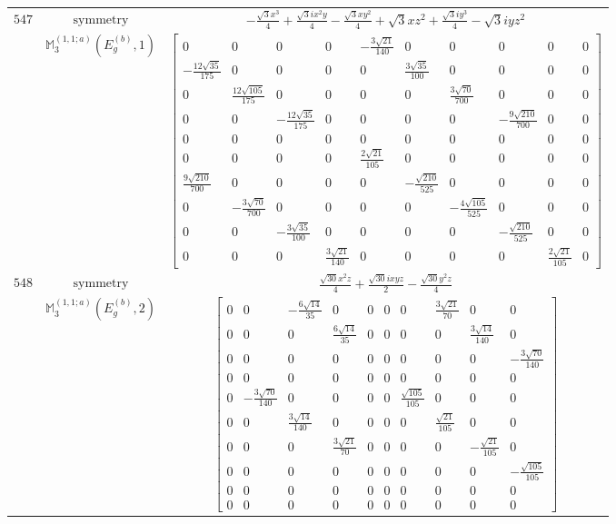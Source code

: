 \documentclass[fleqn,8pt,landscape]{jsarticle}
\begin{document}
\begin{longtable}{ccc}
$ 547 $ & $ \text{symmetry} $ & $ - \frac{\sqrt{3} x^{3}}{4} + \frac{\sqrt{3} i x^{2} y}{4} - \frac{\sqrt{3} x y^{2}}{4} + \sqrt{3} x z^{2} + \frac{\sqrt{3} i y^{3}}{4} - \sqrt{3} i y z^{2} $ \\
$  $ & $ \mathbb{M}_{3}^{(1,1;a)}(E_{g}^{(b)},1) $ & $ \begin{bmatrix} 0 & 0 & 0 & 0 & - \frac{3 \sqrt{21}}{140} & 0 & 0 & 0 & 0 & 0 \\ - \frac{12 \sqrt{35}}{175} & 0 & 0 & 0 & 0 & \frac{3 \sqrt{35}}{100} & 0 & 0 & 0 & 0 \\ 0 & \frac{12 \sqrt{105}}{175} & 0 & 0 & 0 & 0 & \frac{3 \sqrt{70}}{700} & 0 & 0 & 0 \\ 0 & 0 & - \frac{12 \sqrt{35}}{175} & 0 & 0 & 0 & 0 & - \frac{9 \sqrt{210}}{700} & 0 & 0 \\ 0 & 0 & 0 & 0 & 0 & 0 & 0 & 0 & 0 & 0 \\ 0 & 0 & 0 & 0 & \frac{2 \sqrt{21}}{105} & 0 & 0 & 0 & 0 & 0 \\ \frac{9 \sqrt{210}}{700} & 0 & 0 & 0 & 0 & - \frac{\sqrt{210}}{525} & 0 & 0 & 0 & 0 \\ 0 & - \frac{3 \sqrt{70}}{700} & 0 & 0 & 0 & 0 & - \frac{4 \sqrt{105}}{525} & 0 & 0 & 0 \\ 0 & 0 & - \frac{3 \sqrt{35}}{100} & 0 & 0 & 0 & 0 & - \frac{\sqrt{210}}{525} & 0 & 0 \\ 0 & 0 & 0 & \frac{3 \sqrt{21}}{140} & 0 & 0 & 0 & 0 & \frac{2 \sqrt{21}}{105} & 0 \end{bmatrix} $ \\ \hline
$ 548 $ & $ \text{symmetry} $ & $ \frac{\sqrt{30} x^{2} z}{4} + \frac{\sqrt{30} i x y z}{2} - \frac{\sqrt{30} y^{2} z}{4} $ \\
$  $ & $ \mathbb{M}_{3}^{(1,1;a)}(E_{g}^{(b)},2) $ & $ \begin{bmatrix} 0 & 0 & - \frac{6 \sqrt{14}}{35} & 0 & 0 & 0 & 0 & \frac{3 \sqrt{21}}{70} & 0 & 0 \\ 0 & 0 & 0 & \frac{6 \sqrt{14}}{35} & 0 & 0 & 0 & 0 & \frac{3 \sqrt{14}}{140} & 0 \\ 0 & 0 & 0 & 0 & 0 & 0 & 0 & 0 & 0 & - \frac{3 \sqrt{70}}{140} \\ 0 & 0 & 0 & 0 & 0 & 0 & 0 & 0 & 0 & 0 \\ 0 & - \frac{3 \sqrt{70}}{140} & 0 & 0 & 0 & 0 & \frac{\sqrt{105}}{105} & 0 & 0 & 0 \\ 0 & 0 & \frac{3 \sqrt{14}}{140} & 0 & 0 & 0 & 0 & \frac{\sqrt{21}}{105} & 0 & 0 \\ 0 & 0 & 0 & \frac{3 \sqrt{21}}{70} & 0 & 0 & 0 & 0 & - \frac{\sqrt{21}}{105} & 0 \\ 0 & 0 & 0 & 0 & 0 & 0 & 0 & 0 & 0 & - \frac{\sqrt{105}}{105} \\ 0 & 0 & 0 & 0 & 0 & 0 & 0 & 0 & 0 & 0 \\ 0 & 0 & 0 & 0 & 0 & 0 & 0 & 0 & 0 & 0 \end{bmatrix} $ \\ \hline
\end{longtable}
\end{document}
